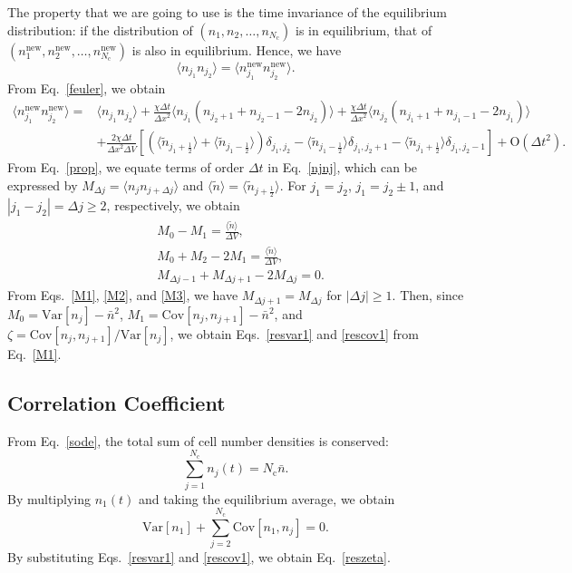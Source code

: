 \documentclass{article}
\newcommand{\Var}{\mathrm{Var}}
\newcommand{\Cov}{\mathrm{Cov}}
\newcommand{\dx}{{\Delta x}}
\newcommand{\dt}{{\Delta t}}
\newcommand{\dV}{{\Delta V}}
\newcommand{\avgntilde}{{\langle\tilde{n}\rangle}}
\newcommand{\Nc}{{N_\mathrm{c}}}
\newcommand{\nb}{\bar{n}}
\begin{document}
The property that we are going to use is the time invariance of the equilibrium distribution:
if the distribution of $(n_1,n_2,\dots,n_\Nc)$ is in equilibrium, that of $(n_1^\mathrm{new},n_2^\mathrm{new},\dots,n_\Nc^\mathrm{new})$ is also in equilibrium.
Hence, we have
\begin{equation}
\label{prop}
\langle n_{j_1} n_{j_2} \rangle
=\langle n_{j_1}^\mathrm{new} n_{j_2}^\mathrm{new} \rangle.
\end{equation}
From Eq.~\eqref{feuler}, we obtain
\begin{equation}
\label{njnj}
\begin{split}
\langle n_{j_1}^\mathrm{new} n_{j_2}^\mathrm{new} \rangle
=&\langle n_{j_1} n_{j_2} \rangle
+\frac{\chi\dt}{\dx^2}\langle n_{j_1}(n_{j_2+1}+n_{j_2-1}-2n_{j_2})\rangle
+\frac{\chi\dt}{\dx^2}\langle n_{j_2}(n_{j_1+1}+n_{j_1-1}-2n_{j_1})\rangle\\
&+\frac{2\chi\dt}{\dx^2\dV}\left[
\left(\langle\tilde{n}_{j_1+\frac12}\rangle+\langle\tilde{n}_{j_1-\frac12}\rangle\right)\delta_{j_1,j_2}
-\langle\tilde{n}_{j_1-\frac12}\rangle\delta_{j_1,j_2+1}
-\langle\tilde{n}_{j_1+\frac12}\rangle\delta_{j_1,j_2-1}
\right]
+\mathrm{O}(\dt^2).
\end{split}
\end{equation}
From Eq.~\eqref{prop}, we equate terms of order $\dt$ in Eq.~\eqref{njnj}, which can be expressed by $M_{\Delta j}=\langle n_j n_{j+\Delta j}\rangle$ and $\avgntilde=\langle\tilde{n}_{j+\frac12}\rangle$.
For $j_1=j_2$, $j_1=j_2\pm 1$, and $\left|j_1-j_2\right|=\Delta j\ge2$, respectively, we obtain
\begin{align}
\label{M1}
&M_0 - M_1 = \frac{\avgntilde}{\dV},\\
\label{M2}
&M_0+M_2-2M_1=\frac{\avgntilde}{\dV},\\
\label{M3}
&M_{\Delta j-1}+M_{\Delta j+1}-2M_{\Delta j}=0.
\end{align}
From Eqs.~\eqref{M1}, \eqref{M2}, and \eqref{M3}, we have $M_{\Delta j+1} = M_{\Delta j}$ for $\left|\Delta j\right|\ge1$.
Then, since $M_0=\Var[n_j]-\nb^2$, $M_1=\Cov[n_j,n_{j+1}]-\nb^2$, and $\zeta=\Cov[n_j,n_{j+1}]/\Var[n_j]$, we obtain Eqs.~\eqref{resvar1} and \eqref{rescov1} from Eq.~\eqref{M1}.

\subsection{Correlation Coefficient}

From Eq.~\eqref{sode}, the total sum of cell number densities is conserved:
\begin{equation}
\sum_{j=1}^{\Nc}n_j(t)=\Nc\nb.
\end{equation}
By multiplying $n_1(t)$ and taking the equilibrium average, we obtain
\begin{equation}
\Var[n_1]+\sum_{j=2}^\Nc\Cov[n_1,n_j]=0.
\end{equation}
By substituting Eqs.~\eqref{resvar1} and \eqref{rescov1}, we obtain Eq.~\eqref{reszeta}.
\end{document}
